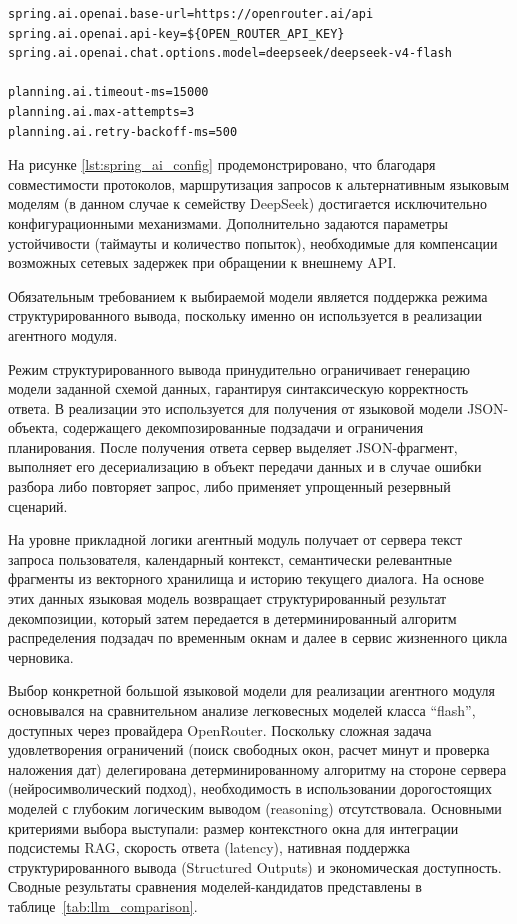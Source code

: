 \begin{samepage}
\begin{lstlisting}[basicstyle=\footnotesize\ttfamily, frame=single,
    caption={Фрагмент конфигурации приложения для подключения OpenRouter},
    label={lst:spring_ai_config}]
spring.ai.openai.base-url=https://openrouter.ai/api
spring.ai.openai.api-key=${OPEN_ROUTER_API_KEY}
spring.ai.openai.chat.options.model=deepseek/deepseek-v4-flash

planning.ai.timeout-ms=15000
planning.ai.max-attempts=3
planning.ai.retry-backoff-ms=500
\end{lstlisting}
\end{samepage}

На рисунке \ref{lst:spring_ai_config} продемонстрировано, что благодаря совместимости протоколов, маршрутизация запросов к альтернативным языковым моделям (в данном случае к семейству DeepSeek) достигается исключительно конфигурационными механизмами. Дополнительно задаются параметры устойчивости (таймауты и количество попыток), необходимые для компенсации возможных сетевых задержек при обращении к внешнему API.

Обязательным требованием к выбираемой модели является поддержка режима структурированного вывода, поскольку именно он используется в реализации агентного модуля.

Режим структурированного вывода принудительно ограничивает генерацию модели заданной схемой данных, гарантируя синтаксическую корректность ответа. В реализации это используется для получения от языковой модели JSON-объекта, содержащего декомпозированные подзадачи и ограничения планирования. После получения ответа сервер выделяет JSON-фрагмент, выполняет его десериализацию в объект передачи данных и в случае ошибки разбора либо повторяет запрос, либо применяет упрощенный резервный сценарий.

На уровне прикладной логики агентный модуль получает от сервера текст запроса пользователя, календарный контекст, семантически релевантные фрагменты из векторного хранилища и историю текущего диалога. На основе этих данных языковая модель возвращает структурированный результат декомпозиции, который затем передается в детерминированный алгоритм распределения подзадач по временным окнам и далее в сервис жизненного цикла черновика.

\numberedparagraph
Выбор конкретной большой языковой модели для реализации агентного модуля основывался на сравнительном анализе легковесных моделей класса ``flash'', доступных через провайдера OpenRouter. Поскольку сложная задача удовлетворения ограничений (поиск свободных окон, расчет минут и проверка наложения дат) делегирована детерминированному алгоритму на стороне сервера (нейросимволический подход), необходимость в использовании дорогостоящих моделей с глубоким логическим выводом (reasoning) отсутствовала. Основными критериями выбора выступали: размер контекстного окна для интеграции подсистемы RAG, скорость ответа (latency), нативная поддержка структурированного вывода (Structured Outputs) и экономическая доступность. Сводные результаты сравнения моделей-кандидатов представлены в таблице~\ref{tab:llm_comparison}.

